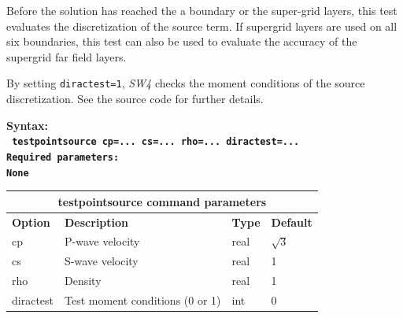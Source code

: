 \documentclass[11pt]{report}
\begin{document}
Before the solution has reached the a boundary or the super-grid layers, this test evaluates the
discretization of the source term. If supergrid layers are used on all six boundaries, this test can
also be used to evaluate the accuracy of the supergrid far field layers.

By setting \verb+diractest=1+, \emph{SW4} checks the moment conditions of the source
discretization. See the source code for further details.
\begin{flushleft}
\bf
Syntax:\\
\tt
testpointsource
cp=... cs=... rho=... diractest=...
\\
\bf 
Required parameters:\\
\rm
None
\end{flushleft}
\begin{center}
\begin{tabular}{|l|p{8cm}|l|l|} \hline
\multicolumn{4}{|c|}{\bf testpointsource command parameters}\\ \hline
\bf{Option} & \bf{Description} & \bf{Type} & \bf{Default} \\ \hline \hline
cp   & P-wave velocity & real & $\sqrt{3}$ \\ \hline
cs   & S-wave velocity & real & 1 \\ \hline
rho  & Density & real & 1 \\ \hline
diractest & Test moment conditions (0 or 1) & int & 0 \\ \hline
\end{tabular}
\end{center}

\end{document}
